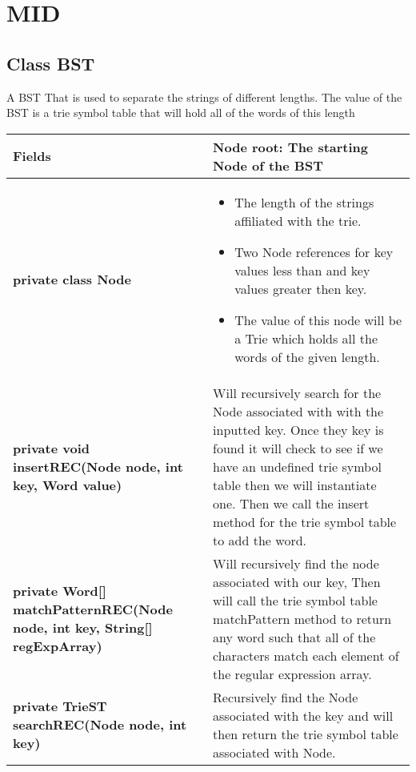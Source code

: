 \documentclass[11pt]{article}
\begin{document}
\newpage
\section{MID}
\subsection{Class BST }

A BST That is used to separate the strings of different lengths. The value of the BST is a trie symbol table that will hold all of the words of this length

\begin{tabular}{|p{}|p{}|}
\hline
\textbf{Fields} &  Node root: The starting Node of the BST \\
\hline
\textbf{private class Node} & 
\begin{itemize}
	\item The length of the strings affiliated with the trie.
	\item Two Node references for key values less than and key values greater then key.
	\item The value of this node will be a Trie which holds all the words of the given length.
\end{itemize} \\
\hline
\textbf{private void insertREC(Node node, int key, Word value)} &

Will recursively search for the Node associated with with the inputted key. Once they key is found it will check to see if we have an undefined trie symbol table then we will instantiate one. Then we call the insert method for the trie symbol table to add the word.\\
\hline
\textbf{private Word[] matchPatternREC(Node node, int key, String[] regExpArray)} &

Will recursively find the node associated with our key, Then will call the trie symbol table matchPattern method to return any word such that all of the characters match each element of the regular expression array. \\
\hline
\textbf{private TrieST searchREC(Node node, int key)} &

Recursively find the Node associated with the key and will then return the trie symbol table associated with Node.\\
\hline
\end{tabular}
\end{document}
